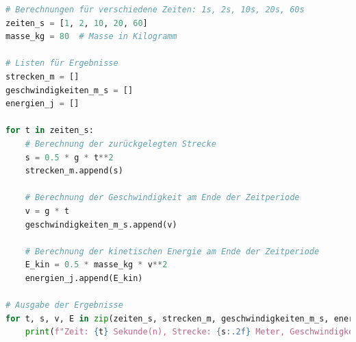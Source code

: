 \documentclass{vorlage-design-main}
\begin{document}
\begin{lstlisting}[language=Python]
# Berechnungen für verschiedene Zeiten: 1s, 2s, 10s, 20s, 60s
zeiten_s = [1, 2, 10, 20, 60]
masse_kg = 80  # Masse in Kilogramm

# Listen für Ergebnisse
strecken_m = []
geschwindigkeiten_m_s = []
energien_j = []

for t in zeiten_s:
    # Berechnung der zurückgelegten Strecke
    s = 0.5 * g * t**2
    strecken_m.append(s)
    
    # Berechnung der Geschwindigkeit am Ende der Zeitperiode
    v = g * t
    geschwindigkeiten_m_s.append(v)
    
    # Berechnung der kinetischen Energie am Ende der Zeitperiode
    E_kin = 0.5 * masse_kg * v**2
    energien_j.append(E_kin)

# Ausgabe der Ergebnisse
for t, s, v, E in zip(zeiten_s, strecken_m, geschwindigkeiten_m_s, energien_j):
    print(f"Zeit: {t} Sekunde(n), Strecke: {s:.2f} Meter, Geschwindigkeit: {v:.2f} m/s, Kinetische Energie: {E:.2f} Joule")
\end{lstlisting}
\end{document}
